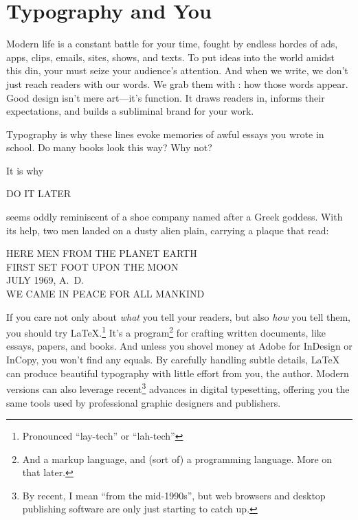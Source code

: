 \chapter{Typography and You}
\label{typography}

Modern life is a constant battle for your time,
fought by endless hordes of ads, apps, clips, emails, sites, shows, and texts.
To put ideas into the world amidst this din,
your must seize your audience's attention.
And when we write, we don't just reach readers with our words.
We grab them with : how those words appear.
Good design isn't mere art---it's function.
It draws readers in,
informs their expectations, and builds a subliminal brand for your
work.\punckern{}
\begin{leftfigure}
\fontsize{12bp}{24bp}\selectfont\raggedright
Typography is why these lines evoke memories of awful essays
you wrote in school.
Do many books look this way? Why not?
\end{leftfigure}
\medskip

\noindent It is why
\begin{leftfigure}
\Large DO IT LATER
\end{leftfigure}
seems oddly reminiscent of a shoe company named after a Greek goddess.
With its help,\punckern{}
two men landed on a dusty alien plain, carrying a plaque that read:
\begin{center}
HERE MEN FROM THE PLANET EARTH \\
FIRST SET FOOT UPON THE MOON \\
JULY 1969, A.~D. \\
WE CAME IN PEACE FOR ALL MANKIND
\end{center}

If you care not only about \emph{what} you tell your readers, but also \emph{how}
you tell them, you should try \LaTeX.\punckern\footnote{Pronounced ``lay-tech''
or ``lah-tech''}
It's a program\footnote{And a markup language,
and (sort of) a programming language.
More on that later.}
for crafting written documents, like essays, papers, and books.
And unless you shovel money at Adobe for InDesign or InCopy,
you won't find any equals.
By carefully handling subtle details,
\LaTeX{} can produce beautiful typography
with little effort from you, the author.
Modern versions can also leverage recent\footnote{By recent,
I mean ``from the mid-1990s''\quotekern, but web browsers and desktop publishing
software are only just starting to catch up.} advances in digital typesetting,
offering you the same tools used by professional graphic designers and
publishers.

